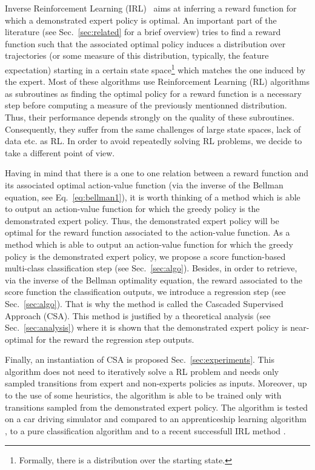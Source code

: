 \documentclass[smallextended]{svjour3}
\begin{document}
Inverse Reinforcement Learning (IRL)~\cite{russell1998learning} aims at inferring a reward function for which a demonstrated expert policy is optimal. An important part of the literature (see Sec.~\ref{sec:related} for a brief overview) tries to find a reward function such that the associated optimal policy induces a distribution over trajectories (or some measure of this distribution, typically, the feature expectation) starting in a certain state space\footnote{Formally, there is a distribution over the starting state.} which matches the one induced by the expert. Most of these algorithms use Reinforcement
Learning (RL) algorithms as subroutines as finding the optimal policy for a reward function is a necessary step before computing a measure of the previously mentionned distribution. Thus, their performance depends strongly on the quality of these subroutines. Consequently, they suffer from the same challenges of large state spaces, lack of data etc. as RL. In order to avoid repeatedly solving RL problems, we decide to take a different point of view.

Having in mind that there is a one to one relation between a reward function and its associated optimal action-value function (via the inverse of the Bellman equation, see Eq.~\ref{eq:bellman1}), it is worth thinking of a method which is able to output an action-value function for which the greedy policy is the demonstrated expert policy. Thus, the demonstrated expert policy will be optimal for the reward function associated to the action-value function. As a method which is able to output an action-value function for which the greedy policy is the demonstrated expert policy, we propose a score function-based multi-class classification step (see Sec.~\ref{sec:algo}). Besides, in order to retrieve, via the inverse of the Bellman optimality equation, the reward associated to the score function the classification outputs, we introduce a regression step (see Sec.~\ref{sec:algo}). That is why the method is called the Cascaded Supervised Approach (CSA). This method is justified by a theoretical analysis (see Sec.~\ref{sec:analysis}) where it is shown that the demonstrated expert policy is near-optimal for the reward the regression step outputs.

Finally, an instantiation of CSA is proposed Sec.~\ref{sec:experiments}. This algorithm does not need to iteratively solve a RL problem and needs only sampled transitions from expert and non-experts policies as inputs. Moreover, up to the use of some heuristics, the algorithm is able to be trained only with transitions sampled from the demonstrated expert policy. The algorithm is tested on a car driving simulator and compared to an apprenticeship learning algorithm \cite{abbeel2004apprenticeship}, to a pure classification algorithm \cite{taskar2005learning} and to a recent successfull IRL method \cite{klein2012scirl}.
\end{document}
